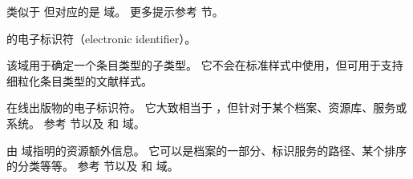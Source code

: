 \begin{fieldlist}

类似于  但对应的是  域。
更多提示参考  节。




 的电子标识符（electronic identifier）。




该域用于确定一个条目类型的子类型。
它不会在标准样式中使用，但可用于支持细粒化条目类型的文献样式。




在线出版物的电子标识符。
它大致相当于 ，但针对于某个档案、资源库、服务或系统。
参考  节以及  和  域。




由  域指明的资源额外信息。
它可以是档案的一部分、标识服务的路径、某个排序的分类等等。
参考  节以及  和  域。




\end{fieldlist}
